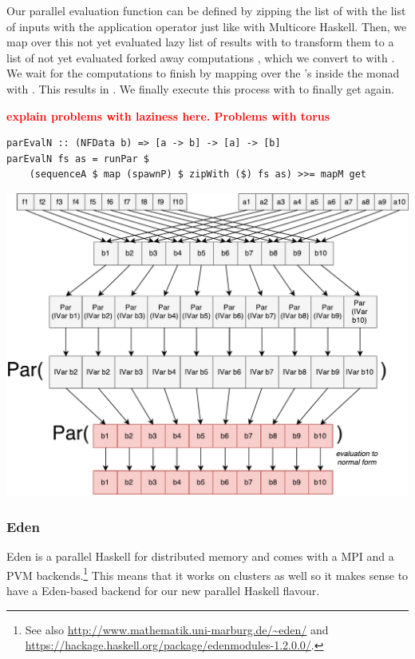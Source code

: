 Our parallel evaluation function  can be defined by zipping the list of \code{[a -> b]} with the list of inputs \code{[a]} with the application operator \code{\$} just like with Multicore Haskell. Then, we map over this not yet evaluated lazy list of results \code{[b]} with  to transform them to a list of not yet evaluated forked away computations , which we convert to  with . We wait for the computations to finish by mapping over the 's inside the  monad with . This results in . We finally execute this process with  to finally get \code{[b]} again.

\textbf{\textcolor{red}{explain problems with laziness here. Problems with torus}}

\begin{lstlisting}[frame=htrbl]
parEvalN :: (NFData b) => [a -> b] -> [a] -> [b]
parEvalN fs as = runPar $ 
	(sequenceA $ map (spawnP) $ zipWith ($) fs as) >>= mapM get
\end{lstlisting}
\begin{center}
	\includegraphics[scale=0.5]{images/parEvalNParMonad}
\end{center}

\subsubsection{Eden}
Eden \cite{eden,Loogen2012} is a parallel Haskell for distributed memory and comes with a MPI and a PVM backends.\footnote{See also \url{http://www.mathematik.uni-marburg.de/~eden/} and \url{https://hackage.haskell.org/package/edenmodules-1.2.0.0/}.} This means that it works on clusters as well so it makes sense to have a Eden-based backend for our new parallel Haskell flavour.

